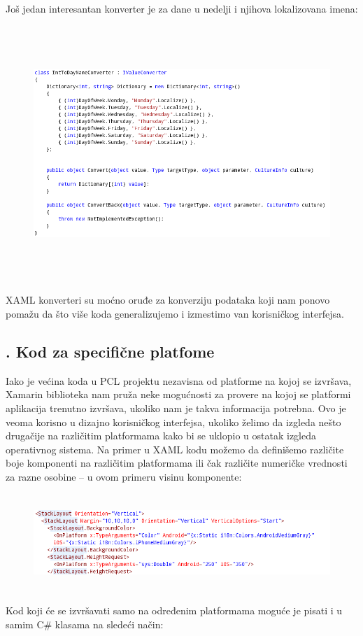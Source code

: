 \documentclass[a4paper]{article}
\begin{document}
Još jedan interesantan konverter je za dane u nedelji i njihova
lokalizovana imena:



\begin{figure}
\centering
\includegraphics[width=170mm,height=96.36mm]{msc-img65.png}
\end{figure}
XAML konverteri su moćno oruđe za konverziju podataka koji nam ponovo
pomažu da što više koda generalizujemo i izmestimo van korisničkog
interfejsa.

\subsection[7.9. Kod za specifične platfome]{. Kod za
specifične platfome}
\hypertarget{RefHeadingToc873882405265}{}Iako je većina koda u PCL
projektu nezavisna od platforme na kojoj se izvršava, Xamarin
biblioteka nam pruža neke mogućnosti za provere na kojoj se platformi
aplikacija trenutno izvršava, ukoliko nam je takva informacija
potrebna. Ovo je veoma korisno u dizajno korisničkog interfejsa,
ukoliko želimo da izgleda nešto drugačije na različitim platformama
kako bi se uklopio u ostatak izgleda operativnog sistema. Na primer u
XAML kodu možemo da definišemo različite boje komponenti na različitim
platformama ili čak različite numeričke vrednosti za razne osobine – u
ovom primeru visinu komponente:



\begin{figure}
\centering
\includegraphics[width=170mm,height=36.78mm]{msc-img66.png}
\end{figure}
Kod koji će se izvršavati samo na određenim platformama moguće je pisati
i u samim C\# klasama na sledeći način:
\end{document}
